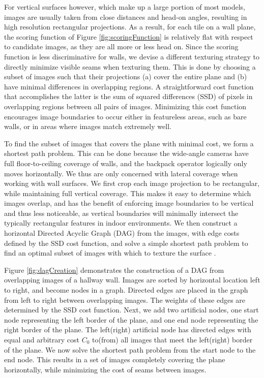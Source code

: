 \documentclass[]{spie}  %
\begin{document}
For vertical surfaces however, which make up a large portion of most
models, images are usually taken from close distances and head-on
angles, resulting in high resolution rectangular projections. As a
result, for each tile on a wall plane, the scoring function of Figure
\ref{fig:scoringFunction} is relatively flat with respect to candidate
images, as they are all more or less head on. Since the scoring
function is less discriminative for walls, we devise a different
texturing strategy to directly minimize visible seams when texturing
them. This is done by choosing a subset of images such that their
projections (a) cover the entire plane and (b) have minimal
differences in overlapping regions. A straightforward cost function
that accomplishes the latter is the sum of squared differences (SSD)
of pixels in overlapping regions between all pairs of
images. Minimizing this cost function encourages image boundaries to
occur either in featureless areas, such as bare walls, or in areas
where images match extremely well.

To find the subset of images that covers the plane with minimal cost,
we form a shortest path problem. This can be done because the
wide-angle cameras have full floor-to-ceiling coverage of walls, and
the backpack operator logically only moves horizontally. We thus are
only concerned with lateral coverage when working with wall
surfaces. We first crop each image projection to be rectangular, while
maintaining full vertical coverage. This makes it easy to determine
which images overlap, and has the benefit of enforcing image
boundaries to be vertical and thus less noticeable, as vertical
boundaries will minimally intersect the typically rectangular features
in indoor environments. We then construct a horizontal Directed
Acyclic Graph (DAG) from the images, with edge costs defined by the
SSD cost function, and solve a simple shortest path problem to find an
optimal subset of images with which to texture the surface
\cite{dijkstra}.


Figure \ref{fig:dagCreation} demonstrates the construction of a DAG
from overlapping images of a hallway wall. Images are sorted by
horizontal location left to right, and become nodes in a
graph. Directed edges are placed in the graph from left to right
between overlapping images. The weights of these edges are determined
by the SSD cost function. Next, we add two artificial nodes, one start
node representing the left border of the plane, and one end node
representing the right border of the plane. The left(right) artificial
node has directed edges with equal and arbitrary cost $C_0$ to(from)
all images that meet the left(right) border of the plane. We now solve
the shortest path problem from the start node to the end node. This
results in a set of images completely covering the plane horizontally,
while minimizing the cost of seams between images.
\end{document}
